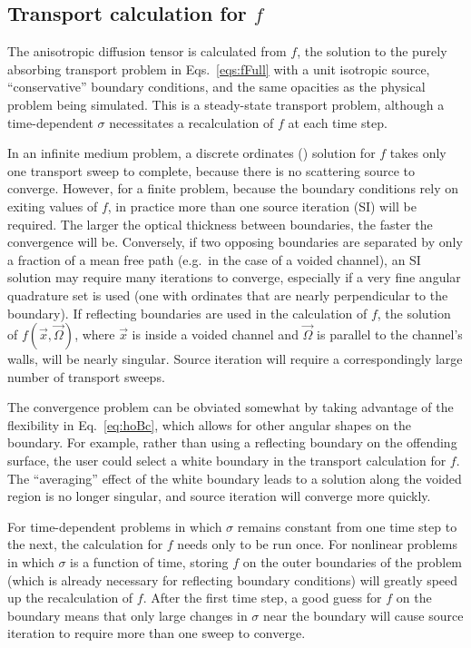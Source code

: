 \subsection{Transport calculation for \texorpdfstring{$f$}{f}}

The anisotropic diffusion tensor is calculated from $f$, the solution to the
purely absorbing transport problem in Eqs.~\eqref{eqs:fFull}  with a unit
isotropic source,
``conservative'' boundary conditions, and the same opacities as the physical problem
being simulated. This is a steady-state transport problem, although a
time-dependent $\sigma$ necessitates a recalculation of $f$ at each time step.

In an infinite medium problem, a discrete ordinates (\SN)
solution for $f$ takes only one transport sweep to complete, because there
is no scattering source to converge. However, for a finite problem, because the boundary conditions
rely on exiting values of $f$, in practice more than one source iteration
(SI) will be required. The
larger the optical thickness between boundaries, the faster the convergence will
be. Conversely, if
two opposing boundaries are separated by only a fraction of a mean free path
(e.g.\ in the case of a voided channel), an SI solution may require many
iterations to converge, especially if a very fine angular quadrature set is used
(one with ordinates that are nearly perpendicular to the boundary). If
reflecting boundaries are used in the calculation of $f$, the solution of
$f(\vec{x},\vec{\Omega})$, where $\vec{x}$ is inside a voided channel and
$\vec{\Omega}$ is parallel to the channel's walls, will be nearly singular.
Source iteration will require a correspondingly large number of transport
sweeps.

The convergence problem can be obviated somewhat by taking advantage of the
flexibility in Eq.~\eqref{eq:hoBc}, which allows for other angular shapes on the
boundary. For example, rather than using a reflecting boundary on the offending
surface, the user could select a white boundary in the transport calculation for
$f$. The ``averaging'' effect of the white boundary leads to a solution along
the voided region is no longer singular, and source iteration will converge more
quickly.

For time-dependent problems in which $\sigma$ remains constant from one
time step to the next, the calculation for $f$ needs only to be run once. For
nonlinear problems in which $\sigma$ is a function of time, storing $f$ on the
outer boundaries of the problem (which is already necessary for reflecting
boundary conditions) will greatly speed up the recalculation of $f$. After the
first time step, a good guess for $f$ on the boundary means that only
large changes in $\sigma$ near the boundary will cause source iteration to
require more than one sweep to converge.

